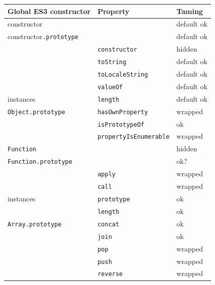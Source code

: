 \documentclass[letterpaper,twocolumn,10pt]{article}
\newcommand{\code}[1]{{\tt {#1}}}              %
\begin{document}
\begin{figure}
\begin{tabular}{lll}
  Global ES3 constructor         & Property                    & Taming \\
  \hline 
  constructor                    &                             & default ok \\
  constructor\code{.prototype}   &                             & default ok \\
                                 & \code{constructor}          & hidden \\
                                 & \code{toString}             & default ok \\
                                 & \code{toLocaleString}       & default ok \\
                                 & \code{valueOf}              & default ok \\
  instances                      & \code{length}               & default ok \\
  \hline
  \code{Object.prototype}        & \code{hasOwnProperty}       & wrapped \\
                                 & \code{isPrototypeOf}        & ok \\
                                 & \code{propertyIsEnumerable} & wrapped \\
  \hline
  \code{Function}                &                             & hidden \\
  \code{Function.prototype}      &                             & ok? \\
                                 & \code{apply}                & wrapped \\
                                 & \code{call}                 & wrapped \\
  instances                      & \code{prototype}            & ok \\
                                 & \code{length}               & ok \\
  \hline
  \code{Array.prototype}         & \code{concat}               & ok \\
                                 & \code{join}                 & ok \\
                                 & \code{pop}                  & wrapped \\
                                 & \code{push}                 & wrapped \\
                                 & \code{reverse}              & wrapped \\

\end{tabular}
\end{figure}
\end{document}
